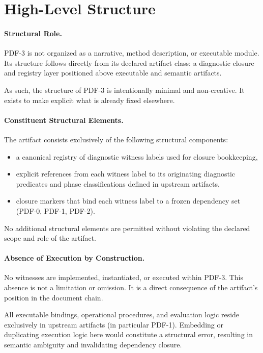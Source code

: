 ﻿\section{High-Level Structure}

\paragraph{Structural Role.}
PDF-3 is not organized as a narrative, method description, or executable module.
Its structure follows directly from its declared artifact class:
a diagnostic closure and registry layer positioned above executable and semantic artifacts.

As such, the structure of PDF-3 is intentionally minimal and non-creative.
It exists to make explicit what is already fixed elsewhere.

\paragraph{Constituent Structural Elements.}
The artifact consists exclusively of the following structural components:
\begin{itemize}
  \item a canonical registry of diagnostic witness labels used for closure bookkeeping,
  \item explicit references from each witness label to its originating diagnostic predicates
        and phase classifications defined in upstream artifacts,
  \item closure markers that bind each witness label to a frozen dependency set
        (PDF-0, PDF-1, PDF-2).
\end{itemize}

No additional structural elements are permitted without violating the declared
scope and role of the artifact.

\paragraph{Absence of Execution by Construction.}
No witnesses are implemented, instantiated, or executed within PDF-3.
This absence is not a limitation or omission.
It is a direct consequence of the artifact’s position in the document chain.

All executable bindings, operational procedures, and evaluation logic reside
exclusively in upstream artifacts (in particular PDF-1).
Embedding or duplicating execution logic here would constitute a structural error,
resulting in semantic ambiguity and invalidating dependency closure.

